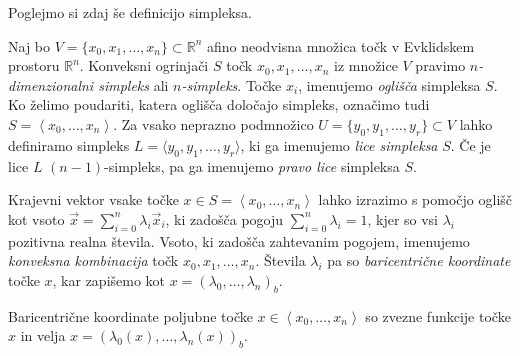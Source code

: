 \documentclass[mat1]{fmfdelo}
\newcommand{\R}{\mathbb R}
\newcommand{\0}{\underline{0}}
\begin{document}
Poglejmo si zdaj še definicijo simpleksa.
\begin{definicija}
Naj bo $V = \{x_0, x_1, \dots , x_n \} \subset \R^n$ afino neodvisna množica točk v Evklidskem prostoru $\R^n$. Konveksni ogrinjači $S$ točk $x_0, x_1, \dots , x_n$ iz množice $V$ pravimo \emph{$n$-dimenzionalni simpleks} ali \emph{$n$-simpleks}. Točke $x_i$, imenujemo \emph{oglišča} simpleksa $S$. Ko želimo poudariti, katera oglišča določajo simpleks, označimo tudi $S = \left < x_0, \dots, x_n \right >$. Za vsako neprazno podmnožico $U = \{ y_0, y_1, \dots, y_r \} \subset V$ lahko definiramo simpleks $L = \langle y_0, y_1, \dots, y_r \rangle$, ki ga imenujemo \emph{lice simpleksa} $S$. Če je lice $L$ $(n-1)$-simpleks, pa ga imenujemo \emph{pravo lice} simpleksa $S$. 
\end{definicija}
 Krajevni vektor vsake točke $x \in S = \left < x_0, \dots, x_n \right >$ lahko izrazimo s pomočjo oglišč kot vsoto $\vec{x} = \sum\limits_{i=0}^n \lambda_i \vec{x}_i$, ki zadošča pogoju $\sum\limits_{i=0}^n \lambda_i = 1$, kjer so vsi $\lambda_i$ pozitivna realna števila. Vsoto, ki zadošča zahtevanim pogojem, imenujemo \emph{konveksna kombinacija} točk $x_0, x_1, \dots , x_n$. Števila $\lambda_i$ pa so \emph{baricentrične koordinate} točke $x$, kar zapišemo kot $x = (\lambda_0, \dots, \lambda_n)_b$.
\begin{trditev}\label{trd:zveznost-baricentra}
Baricentrične koordinate poljubne točke $x \in \left <x_0, \dots, x_n \right >$ so zvezne funkcije točke $x$ in velja $x = (\lambda_0(x), \dots, \lambda_n(x))_b$.
\end{trditev}
\end{document}
